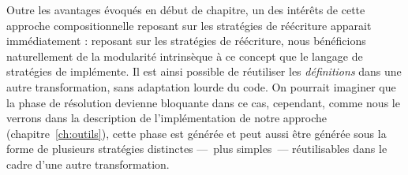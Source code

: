 Outre les avantages évoqués en début de chapitre, un des intérêts de cette
approche compositionnelle reposant sur les stratégies de réécriture apparait
immédiatement : reposant sur les stratégies de réécriture, nous bénéficions
naturellement de la modularité intrinsèque à ce concept que le langage de
stratégies de {\tom} implémente. Il est ainsi possible de réutiliser les
\emph{définitions} dans une autre transformation, sans adaptation lourde du
code. On pourrait imaginer que la phase de résolution devienne bloquante dans
ce cas, cependant, comme nous le verrons dans la description de
l'implémentation de notre approche (chapitre~\ref{ch:outils}), cette phase est
générée et peut aussi être générée sous la forme de plusieurs stratégies
distinctes ---~plus simples~--- réutilisables dans le cadre d'une autre
transformation.


%    




%




%
%
%

